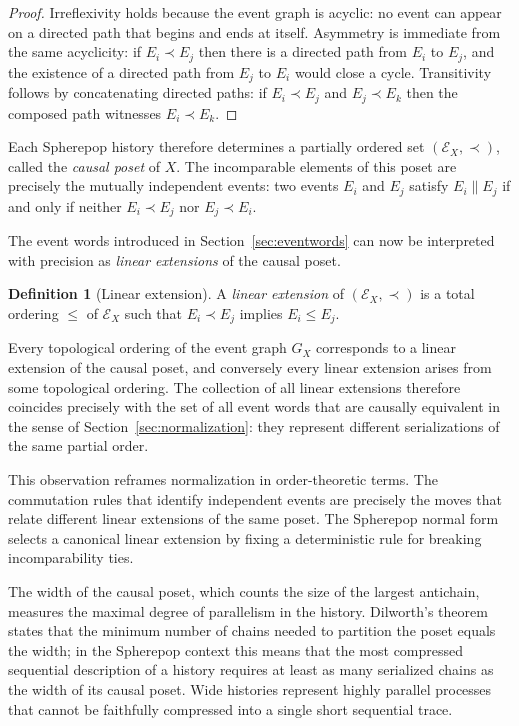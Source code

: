 \documentclass[12pt]{article}
\theoremstyle{plain}
\theoremstyle{definition}
\newtheorem{definition}[theorem]{Definition}
\theoremstyle{remark}
\begin{document}
\begin{proof}
Irreflexivity holds because the event graph is acyclic: no event can appear
on a directed path that begins and ends at itself.  Asymmetry is immediate from
the same acyclicity: if $E_i \prec E_j$ then there is a directed path from
$E_i$ to $E_j$, and the existence of a directed path from $E_j$ to $E_i$ would
close a cycle.  Transitivity follows by concatenating directed paths: if
$E_i \prec E_j$ and $E_j \prec E_k$ then the composed path witnesses
$E_i \prec E_k$.
\end{proof}

Each Spherepop history therefore determines a partially ordered set
$(\mathcal{E}_X, \prec)$, called the \emph{causal poset} of $X$.  The
incomparable elements of this poset are precisely the mutually independent
events: two events $E_i$ and $E_j$ satisfy $E_i \parallel E_j$ if and only if
neither $E_i \prec E_j$ nor $E_j \prec E_i$.

The event words introduced in Section~\ref{sec:eventwords} can now be
interpreted with precision as \emph{linear extensions} of the causal poset.

\begin{definition}[Linear extension]
A \emph{linear extension} of $(\mathcal{E}_X, \prec)$ is a total ordering
$\leq$ of $\mathcal{E}_X$ such that $E_i \prec E_j$ implies $E_i \leq E_j$.
\end{definition}

Every topological ordering of the event graph $G_X$ corresponds to a linear
extension of the causal poset, and conversely every linear extension arises
from some topological ordering.  The collection of all linear extensions
therefore coincides precisely with the set of all event words that are causally
equivalent in the sense of Section~\ref{sec:normalization}: they represent
different serializations of the same partial order.

This observation reframes normalization in order-theoretic terms.  The
commutation rules that identify independent events are precisely the moves
that relate different linear extensions of the same poset.  The Spherepop
normal form selects a canonical linear extension by fixing a deterministic
rule for breaking incomparability ties.

The width of the causal poset, which counts the size of the largest antichain,
measures the maximal degree of parallelism in the history.  Dilworth's theorem
\citep{MacLane1998} states that the minimum number of chains needed to partition
the poset equals the width; in the Spherepop context this means that the most
compressed sequential description of a history requires at least as many
serialized chains as the width of its causal poset.  Wide histories represent
highly parallel processes that cannot be faithfully compressed into a single
short sequential trace.
\end{document}
